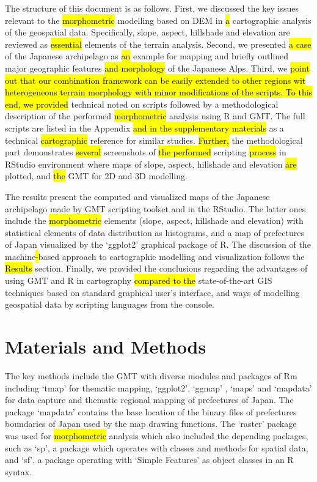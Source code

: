 \documentclass[land,article,submit,pdftex,moreauthors]{Definitions/mdpi}
\begin{document}
The structure of this document is as follows. First, we discussed the key issues relevant to the \hl{morphometric} modelling based on DEM in \hl{a }cartographic analysis of the geospatial data. Specifically, slope, aspect, hillshade and elevation are reviewed as \hl{essential} elements of the terrain analysis. Second, we presented \hl{a case} of the Japanese archipelago as \hl{an} example for mapping and briefly outlined major geographic features \hl{and morphology} of the Japanese Alps. Third, we \hl{point out that our combination framework can be easily extended to other regions wit heterogeneous terrain morphology with minor modifications of the scripts. To this end, we provided } technical noted on scripts followed by a methodological description of the performed \hl{morphometric} analysis using R and GMT. The full scripts are listed in the Appendix \hl{and in the supplementary materials} as a technical \hl{cartographic }reference for similar studies. \hl{Further,} the methodological part demonstrates \hl{several} screenshots of \hl{the performed }scripting \hl{process }in RStudio environment where maps of slope, aspect, hillshade and elevation \hl{are} plotted, and \hl{the }GMT for 2D and 3D modelling. 

The results present the computed and visualized maps of the Japanese archipelago made by GMT scripting toolset and in the RStudio. The latter ones include the \hl{morphometric} elements (slope, aspect, hillshade and elevation) with statistical elements of data distribution as histograms, and a map of prefectures of Japan visualized by the ‘ggplot2’ graphical package of R. The discussion of the machine\hl{-}based approach to cartographic modelling and visualization follows the \hl{Results} section. Finally, we provided the conclusions regarding the advantages of using GMT and R in cartography \hl{compared to the} state-of-the-art GIS techniques based on standard graphical user's interface, and ways of modelling geospatial data by scripting languages from the console. 

\section{Materials and Methods}
The key methods include the GMT with diverse modules and packages of Rm including ‘tmap’ for thematic mapping, ‘ggplot2’, ‘ggmap’ \cite{KahleWickham}, ‘maps’ and ‘mapdata’ for data capture and thematic regional mapping of prefectures of Japan. The package ‘mapdata’ contains the base location of the binary files of prefectures boundaries of Japan used by the map drawing functions. The ‘raster’ package was used for \hl{morphometric} analysis which also included the depending packages, such as ‘sp’, a package which operates with classes and methods for spatial data, and ‘sf’, a package operating with ‘Simple Features’ as object classes in an R syntax. 
\end{document}
